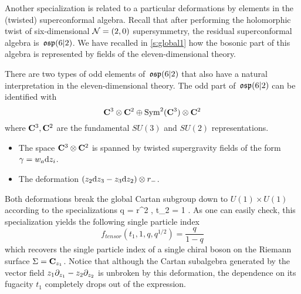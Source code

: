 \parsec

Another specialization is related to a particular deformations by elements in the (twisted) superconformal algebra.
Recall that after performing the holomorphic twist of six-dimensional $\mathcal N=(2,0)$ supersymmetry, the residual superconformal algebra is~$\mathfrak{osp}(6|2)$. 
We have recalled in \ref{s:global1} how the bosonic part of this algebra is represented by fields of the eleven-dimensional theory. 

There are two types of odd elements of~$\mathfrak{osp}(6|2)$ that also have a natural interpretation in the eleven-dimensional theory.
The odd part of~$\mathfrak{osp}(6|2)$ can be identified with 
\[
\mathbf{C}^3 \otimes \mathbf{C}^2 \oplus \operatorname{Sym}^2(\mathbf{C}^3) \otimes \mathbf{C}^2 
\]
where $\mathbf{C}^3, \mathbf{C}^2$ are the fundamental $SU(3)$ and $SU(2)$ representations. 

\begin{itemize}
\item The space $\mathbf{C}^3 \otimes \mathbf{C}^2$ is spanned by twisted supergravity fields of the form $\gamma = w_a {\rm d} z_i$. 
\item The deformation $(z_2 {\rm d} z_3 - z_3 {\rm d} z_2) \otimes r_-$. 
\end{itemize}

Both deformations break the global Cartan subgroup down to $U(1) \times U(1)$ according to the specializations
\beqn\label{eqn:special1}
q = r^2 , \quad t_2 = 1 .
\eeqn
As one can easily check, this specialization yields the following single particle index
\[
f_{tensor}(t_1, 1, q, q^{1/2}) = \frac{q}{1-q} 
\]
which recovers the single particle index of a single chiral boson on the Riemann surface $\Sigma = \mathbf{C}_{z_1}$. 
Notice that although the Cartan subalgebra generated by the vector field $z_1 \partial_{z_1} - z_2 \partial_{z_2}$ is unbroken by this deformation, the dependence on its fugacity $t_1$ completely drops out of the expression.

%

